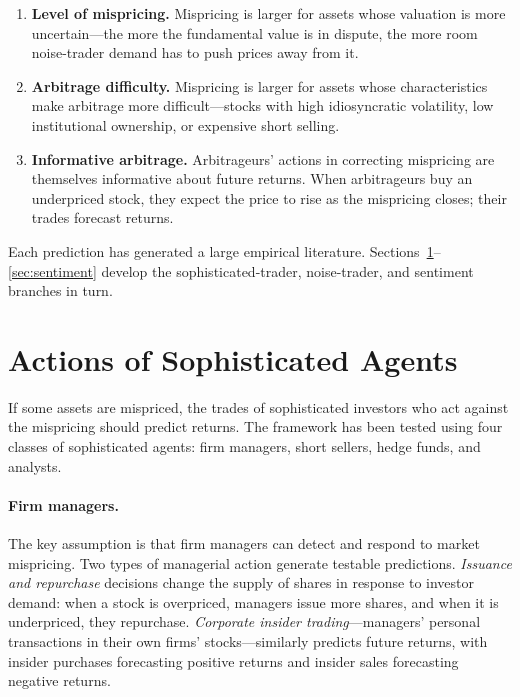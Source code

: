 \begin{enumerate}
\item \textbf{Level of mispricing.} Mispricing is larger for assets whose valuation is more uncertain---the more the fundamental value is in dispute, the more room noise-trader demand has to push prices away from it.
\item \textbf{Arbitrage difficulty.} Mispricing is larger for assets whose characteristics make arbitrage more difficult---stocks with high idiosyncratic volatility, low institutional ownership, or expensive short selling.
\item \textbf{Informative arbitrage.} Arbitrageurs' actions in correcting mispricing are themselves informative about future returns. When arbitrageurs buy an underpriced stock, they expect the price to rise as the mispricing closes; their trades forecast returns.
\end{enumerate}

Each prediction has generated a large empirical literature. Sections~\ref{sec:sophisticated}--\ref{sec:sentiment} develop the sophisticated-trader, noise-trader, and sentiment branches in turn.

\section{Actions of Sophisticated Agents}
\label{sec:sophisticated}

If some assets are mispriced, the trades of sophisticated investors who act against the mispricing should predict returns. The framework has been tested using four classes of sophisticated agents: firm managers, short sellers, hedge funds, and analysts.

\paragraph{Firm managers.} The key assumption is that firm managers can detect and respond to market mispricing. Two types of managerial action generate testable predictions. \emph{Issuance and repurchase} decisions change the supply of shares in response to investor demand: when a stock is overpriced, managers issue more shares, and when it is underpriced, they repurchase. \emph{Corporate insider trading}---managers' personal transactions in their own firms' stocks---similarly predicts future returns, with insider purchases forecasting positive returns and insider sales forecasting negative returns.

